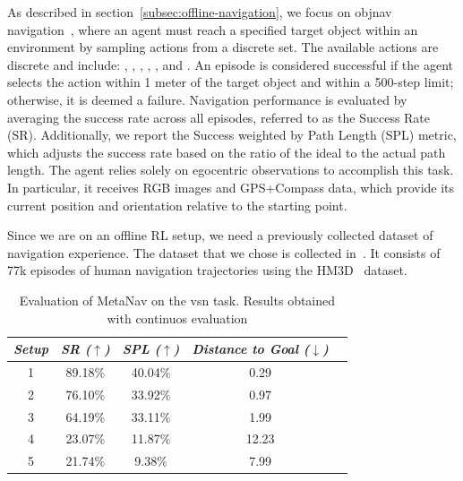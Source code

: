 As described in section~\ref{subsec:offline-navigation}, we focus on \acrshort{objnav} navigation~\cite{batra2020}, where an agent must reach a specified target object within an environment by sampling actions from a discrete set.
The available actions are discrete and include: \turnleft, \turnright, \moveforward, \lookup, \lookdown, and \stopac.
An episode is considered successful if the agent selects the \stopac action within 1 meter of the target object and within a 500-step limit; otherwise, it is deemed a failure.
Navigation performance is evaluated by averaging the success rate across all episodes, referred to as the Success Rate (SR). Additionally, we report the Success weighted by Path Length (SPL) metric, which adjusts the success rate based on the ratio of the ideal to the actual path length.
The agent relies solely on egocentric observations to accomplish this task.
In particular, it receives RGB images and GPS+Compass data, which provide its current position and orientation relative to the starting point.

Since we are on an offline RL setup, we need a previously collected dataset of navigation experience.
The dataset that we chose is collected in~\cite{ramrakhya2023}.
It consists of 77k episodes of human navigation trajectories using the HM3D~\cite{Ramakrishnan2021HabitatMatterport3D} dataset.

\begin{table}
    \centering
    \begin{tabular}{c|cccc}
        \toprule
        \textit{\textbf{Setup}} & \textit{\textbf{SR ($\uparrow$)}} & \textbf{\textit{SPL ($\uparrow$)}} & \textit{\textbf{Distance to Goal ($\downarrow$)}} \\ \midrule
        1                       & 89.18\%                           & 40.04\%                            & 0.29                                              \\
        2                       & 76.10\%                           & 33.92\%                            & 0.97                                              \\
        3                       & 64.19\%                           & 33.11\%                            & 1.99                                              \\
        4                       & 23.07\%                           & 11.87\%                            & 12.23                                             \\
        5                       & 21.74\%                           & 9.38\%                             & 7.99                                              \\
    \end{tabular}
    \caption{Evaluation of MetaNav on the \acrshort{vsn} task. Results obtained with continuos evaluation}
    \label{tab:metanav_continuos}
\end{table}


